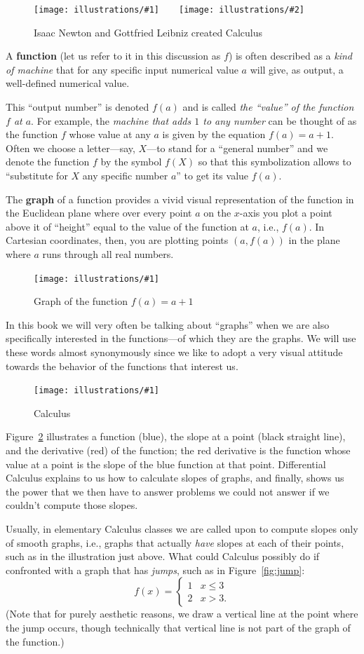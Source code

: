 \documentclass[openany]{book}
\newcommand{\ill}[3]{%
   \begin{figure}[H]%
   \vspace{-2ex}
   \centering%
   \texttt{[image: illustrations/\#1]}%
   \caption{#3}%
   \vspace{-2ex}
    \end{figure}}
\newcommand{\illtwo}[4]{%
   \begin{figure}[H]\centering%
   \texttt{[image: illustrations/\#1]}$\qquad$\texttt{[image: illustrations/\#2]}%
   \caption{#4}%
    \end{figure}}
\theoremstyle{plain}
\theoremstyle{definition}
\begin{document}
 \illtwo{newton}{leibniz}{0.25}{Isaac Newton and Gottfried Leibniz created Calculus}


 A {\bf function} (let us refer to it in this discussion as $f$) is
 often described as a {\it kind of machine} that for any specific
 input numerical value $a$ will give, as output, a well-defined
 numerical value.
 
 This ``output number'' is denoted $f(a)$ and is called {\it the
   ``value'' of the function $f$ at $a$}.  For example, the {\it
   machine that adds $1$ to any number} can be thought of as the
 function $f$ whose value at any $a$ is given by the equation $f(a) =
 a+1$.  Often we choose a letter---say, $X$---to stand for a ``general
 number'' and we denote the function $f$ by the symbol $f(X)$ so that
 this symbolization allows to ``substitute for $X$ any specific number
 $a$'' to get its value $f(a)$.

 The {\bf graph} of a function provides a vivid visual representation of the
 function in the Euclidean plane where over every point $a$ on the
 $x$-axis you plot a point above it of ``height'' equal to the value of
 the function at $a$, i.e., $f(a)$. In Cartesian coordinates, then,
 you are plotting points $(a, f(a))$ in the plane where $a$ runs
 through all real numbers.

 \ill{graph_aplusone}{0.6}{Graph of the function $f(a)=a+1$\label{fig:graph_aplusone}}

 In this book we will very often be talking about ``graphs'' when we
 are also specifically interested in the functions---of which they are
 the graphs. We will use these words almost synonymously since we like
 to adopt a very visual attitude towards the behavior of the functions
 that interest us.


 \ill{graph_slope_deriv}{0.7}{\label{fig:graph_slope_deriv}Calculus}
         
         

 Figure~\ref{fig:graph_slope_deriv} illustrates a function (blue), the
 slope at a point (black straight line), and the derivative (red) of
 the function; the red derivative is the function whose value at a point
 is the slope of the blue function at that point.  Differential
 Calculus explains to us how to calculate slopes of graphs, and
 finally, shows us the power that we then have to answer problems we
 could not answer if we couldn't compute those slopes.

Usually, in elementary Calculus classes we are called upon to compute
slopes only of smooth graphs, i.e., graphs that actually {\em have}
slopes at each of their points, such as in the illustration just
above.  What could Calculus possibly do if confronted with a graph
that has {\em jumps}, such as in Figure~\ref{fig:jump}:
$$f(x) = \begin{cases}1 & x \leq 3\\ 2 & x > 3.\end{cases}$$
(Note that for purely aesthetic reasons, we draw a vertical line at the point where the jump occurs, though technically that vertical line is not part of the graph of the function.)
 
\end{document}
